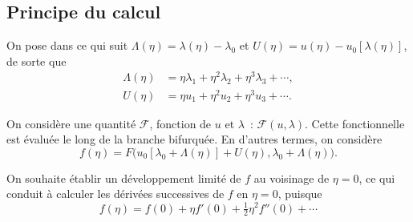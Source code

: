 \documentclass[12pt, final]{amsart}
\begin{document}
\subsection{Principe du calcul}

On pose dans ce qui suit \(\Lambda(\eta)=\lambda(\eta)-\lambda_0\) et
\(U(\eta)=u(\eta)-u_0[\lambda(\eta)]\), de sorte que
\begin{align}
  \label{eq:20211112155446}
  \Lambda(\eta)&=\eta\lambda_1+\eta^2\lambda_2+\eta^3\lambda_3+\cdots,\\
  \label{eq:20211112113028}
  U(\eta)&=\eta u_1+\eta^2 u_2+\eta^3u_3+\cdots.
\end{align}

On considère une quantité \(\mathcal F\), fonction de \(u\) et \(\lambda\)~:
\(\mathcal F(u, \lambda)\). Cette fonctionnelle est évaluée le long de la
branche bifurquée. En d'autres termes, on considère
\begin{equation}
  f(\eta)=F\bigl(u_0[\lambda_0+\Lambda(\eta)]+U(\eta),
  \lambda_0+\Lambda(\eta)\bigr).
\end{equation}

On souhaite établir un développement limité de \(f\) au voisinage de
\(\eta=0\), ce qui conduit à calculer les dérivées successives de \(f\) en
\(\eta=0\), puisque
\begin{equation}
  f(\eta)=f(0)+\eta f'(0)+\tfrac12\eta^2f''(0)+\cdots
\end{equation}
\end{document}

